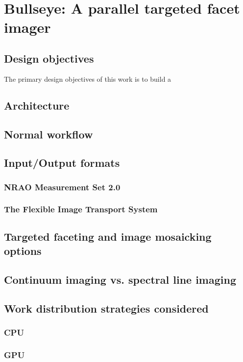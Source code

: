 \chapter{Bullseye: A parallel targeted facet imager}
\section{Design objectives}
The primary design objectives of this work is to build a 
\section{Architecture}
\section{Normal workflow}
\section{Input/Output formats}
\subsection{NRAO Measurement Set 2.0}
\subsection{The Flexible Image Transport System}
\section{Targeted faceting and image mosaicking options}
\section{Continuum imaging vs. spectral line imaging}
\section{Work distribution strategies considered}
\subsection{CPU}
\subsection{GPU}
